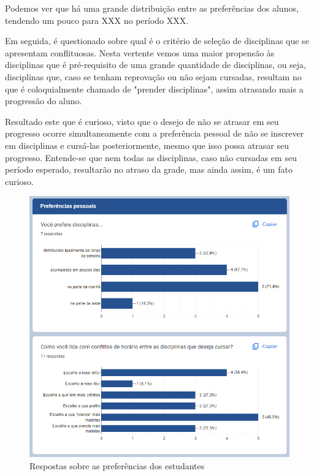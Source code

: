         Podemos ver que há uma grande distribuição entre as preferências dos alunos, tendendo um pouco para XXX no período XXX.

        Em seguida, é questionado sobre qual é o critério de seleção de disciplinas que se apresentam conflituosas. Nesta vertente vemos uma maior propensão às disciplinas que é pré-requisito de uma grande quantidade de disciplinas, ou seja, disciplinas que, caso se tenham reprovação ou não sejam cursadas, resultam no que é coloquialmente chamado de "prender disciplinas", assim atrasando mais a progressão do aluno.

        Resultado este que é curioso, visto que o desejo de não se atrasar em seu progresso ocorre simultaneamente com a preferência pessoal de não se inscrever em disciplinas e cursá-las posteriormente, mesmo que isso possa atrasar seu progresso. Entende-se que nem todas as disciplinas, caso não cursadas em seu período esperado, resultarão no atraso da grade, mas ainda assim, é um fato curioso.

        \begin{figure}[htbp]\centering
            \caption{\label{fig:3_Preferencias} Respostas sobre as preferências dos estudantes}
            \includegraphics[scale=0.8]{files/img/forms/3.0-PreferenciasPessoais.png}
        \end{figure} %

